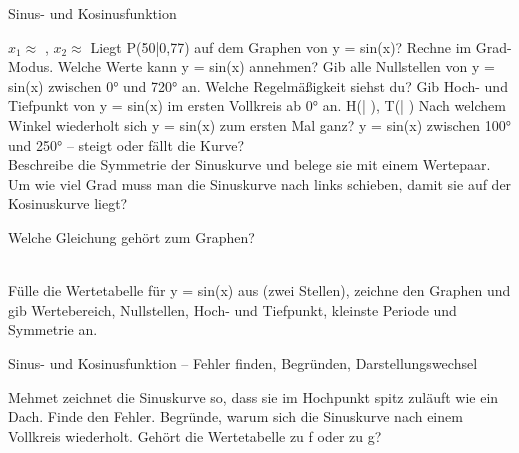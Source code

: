 \begin{aufgabe}{Sinus- und Kosinusfunktion}
\begin{teile}
\begin{ksys}[xmin=0,xmax=360,ymin=-1.2,ymax=1.2,xstep=45,ystep=0.2,ablesen]\end{ksys}
$x_1 \approx$ \leerfeld[°], $x_2 \approx$ \leerfeld[°]
\teil Liegt P(50|0,77) auf dem Graphen von y = sin(x)? Rechne im Grad-Modus. \janein
\teil Welche Werte kann y = sin(x) annehmen? \leerfeld
\teil Gib alle Nullstellen von y = sin(x) zwischen 0° und 720° an. Welche Regelmäßigkeit siehst du? \leerfeld
\teil Gib Hoch- und Tiefpunkt von y = sin(x) im ersten Vollkreis ab 0° an. H(\leerfeld | \leerfeld), T(\leerfeld | \leerfeld)
\teil Nach welchem Winkel wiederholt sich y = sin(x) zum ersten Mal ganz? \leerfeld[°]
\teil y = sin(x) zwischen 100° und 250° – steigt oder fällt die Kurve?\\ 
\teil Beschreibe die Symmetrie der Sinuskurve und belege sie mit einem Wertepaar.
\teil Um wie viel Grad muss man die Sinuskurve nach links schieben, damit sie auf der Kosinuskurve liegt?

\begin{ksys}[xmin=0,xmax=360,ymin=-1.2,ymax=1.2,xstep=45,ystep=0.2,ablesen]\end{ksys}
\leerfeld[°]
\teil Welche Gleichung gehört zum Graphen?\\ \\ 

\begin{ksys}[xmin=0,xmax=360,ymin=-1.2,ymax=1.2,xstep=45,ystep=0.2,ablesen]\end{ksys}
\teil Fülle die Wertetabelle für y = sin(x) aus (zwei Stellen), zeichne den Graphen und gib Wertebereich, Nullstellen, Hoch- und Tiefpunkt, kleinste Periode und Symmetrie an.

 \begin{ksys}[xmin=-180,xmax=180,ymin=-1.2,ymax=1.2,xstep=45,ystep=0.2]\end{ksys}
\end{teile}
\end{aufgabe}

\begin{aufgabe}{Sinus- und Kosinusfunktion – Fehler finden, Begründen, Darstellungswechsel}
\begin{teile}
\teil Mehmet zeichnet die Sinuskurve so, dass sie im Hochpunkt spitz zuläuft wie ein Dach. Finde den Fehler.
\teil Begründe, warum sich die Sinuskurve nach einem Vollkreis wiederholt.
\teil Gehört die Wertetabelle zu f oder zu g?\\ 

 \begin{ksys}[xmin=0,xmax=360,ymin=-1.2,ymax=1.2,xstep=45,ystep=0.2,ablesen]\end{ksys}
\end{teile}
\end{aufgabe}
